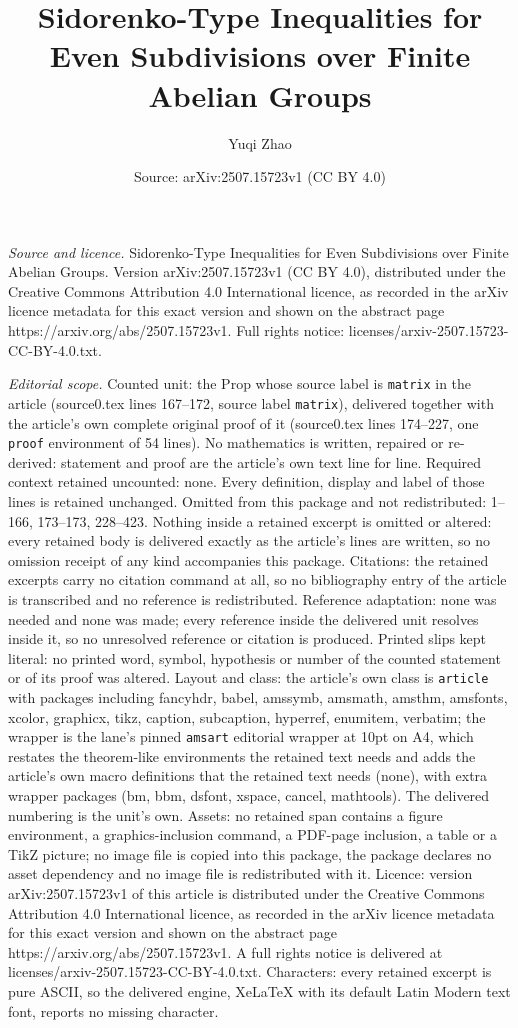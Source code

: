 \documentclass[10pt,a4paper]{amsart}
\title[Sidorenko-Type Inequalities for Even Subdivisions over Finit]{Sidorenko-Type Inequalities for Even Subdivisions over Finite Abelian Groups}
\author{Yuqi Zhao}
\date{Source: arXiv:2507.15723v1 (CC BY 4.0)}
\begin{document}
\maketitle

\noindent\emph{Source and licence.} Sidorenko-Type Inequalities for Even Subdivisions over Finite Abelian Groups. Version arXiv:2507.15723v1 (CC BY 4.0), distributed under the Creative Commons Attribution 4.0 International licence, as recorded in the arXiv licence metadata for this exact version and shown on the abstract page https://arxiv.org/abs/2507.15723v1. Full rights notice: licenses/arxiv-2507.15723-CC-BY-4.0.txt.\par\smallskip

\noindent\textit{Editorial scope.} Counted unit: the Prop whose source label is \texttt{matrix} in the article (source0.tex lines 167--172, source label \texttt{matrix}), delivered together with the article's own complete original proof of it (source0.tex lines 174--227, one \texttt{proof} environment of 54 lines). No mathematics is written, repaired or re-derived: statement and proof are the article's own text line for line. Required context retained uncounted: none. Every definition, display and label of those lines is retained unchanged. Omitted from this package and not redistributed: 1--166, 173--173, 228--423. Nothing inside a retained excerpt is omitted or altered: every retained body is delivered exactly as the article's lines are written, so no omission receipt of any kind accompanies this package. Citations: the retained excerpts carry no citation command at all, so no bibliography entry of the article is transcribed and no reference is redistributed. Reference adaptation: none was needed and none was made; every reference inside the delivered unit resolves inside it, so no unresolved reference or citation is produced. Printed slips kept literal: no printed word, symbol, hypothesis or number of the counted statement or of its proof was altered. Layout and class: the article's own class is \texttt{article} with packages including fancyhdr, babel, amssymb, amsmath, amsthm, amsfonts, xcolor, graphicx, tikz, caption, subcaption, hyperref, enumitem, verbatim; the wrapper is the lane's pinned \texttt{amsart} editorial wrapper at 10pt on A4, which restates the theorem-like environments the retained text needs and adds the article's own macro definitions that the retained text needs (none), with extra wrapper packages (bm, bbm, dsfont, xspace, cancel, mathtools). The delivered numbering is the unit's own. Assets: no retained span contains a figure environment, a graphics-inclusion command, a PDF-page inclusion, a table or a TikZ picture; no image file is copied into this package, the package declares no asset dependency and no image file is redistributed with it. Licence: version arXiv:2507.15723v1 of this article is distributed under the Creative Commons Attribution 4.0 International licence, as recorded in the arXiv licence metadata for this exact version and shown on the abstract page https://arxiv.org/abs/2507.15723v1. A full rights notice is delivered at licenses/arxiv-2507.15723-CC-BY-4.0.txt. Characters: every retained excerpt is pure ASCII, so the delivered engine, XeLaTeX with its default Latin Modern text font, reports no missing character.
\end{document}
